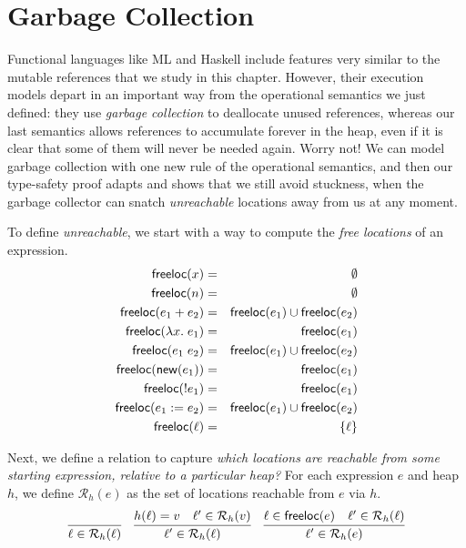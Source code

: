 \documentclass{amsbook}
\theoremstyle{definition}
\theoremstyle{remark}
\numberwithin{section}{chapter}
\numberwithin{equation}{chapter}
\begin{document}
\section{Garbage Collection}

Functional languages like ML and Haskell include features very similar to the mutable references that we study in this chapter.
However, their execution models depart in an important way from the operational semantics we just defined: they use \emph{garbage collection} to deallocate unused references, whereas our last semantics allows references to accumulate forever in the heap, even if it is clear that some of them will never be needed again.
Worry not!
We can model garbage collection with one new rule of the operational semantics, and then our type-safety proof adapts and shows that we still avoid stuckness, when the garbage collector can snatch \emph{unreachable} locations away from us at any moment.

\newcommand{\freeloc}[1]{\mathsf{freeloc}(#1)}

To define \emph{unreachable}, we start with a way to compute the \emph{free locations} of an expression.
\begin{eqnarray*}
  \freeloc{x} &=& \emptyset \\
  \freeloc{n} &=& \emptyset \\
  \freeloc{e_1 + e_2} &=& \freeloc{e_1} \cup \freeloc{e_2} \\
  \freeloc{\lambda x. \; e_1} &=& \freeloc{e_1} \\
  \freeloc{e_1 \; e_2} &=& \freeloc{e_1} \cup \freeloc{e_2} \\
  \freeloc{\newref{e_1}} &=& \freeloc{e_1} \\
  \freeloc{\readref{e_1}} &=& \freeloc{e_1} \\
  \freeloc{\writeref{e_1}{e_2}} &=& \freeloc{e_1} \cup \freeloc{e_2} \\
  \freeloc{\ell} &=& \{\ell\}
\end{eqnarray*}

\newcommand{\reach}[2]{\mathcal R_{#1}(#2)}

Next, we define a relation to capture \emph{which locations are reachable from some starting expression, relative to a particular heap?}
For each expression $e$ and heap $h$, we define $\reach{h}{e}$ as the set of locations reachable from $e$ via $h$.
$$\infer{\ell \in \reach{h}{\ell}}{}
\quad \infer{\ell' \in \reach{h}{\ell}}{
  \msel{h}{\ell} = v
  & \ell' \in \reach{h}{v}
}
\quad \infer{\ell' \in \reach{h}{e}}{
  \ell \in \freeloc{e}
  & \ell' \in \reach{h}{\ell}
}$$
\end{document}
